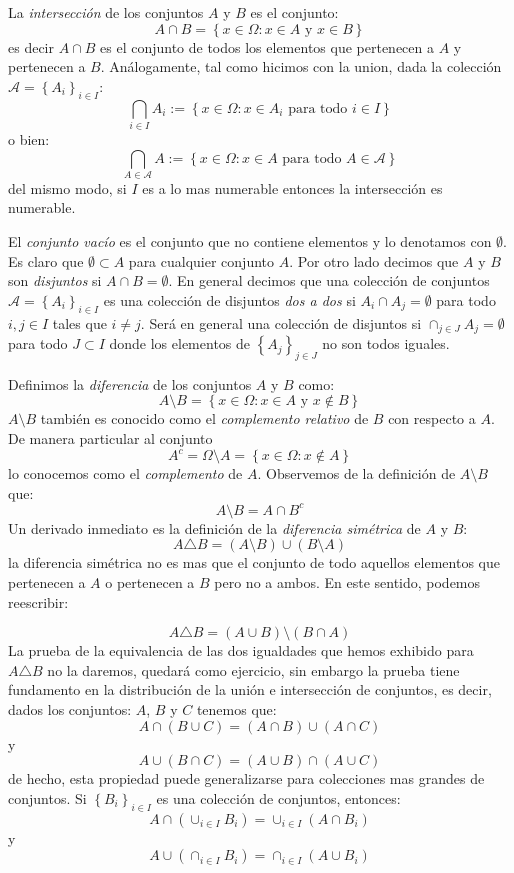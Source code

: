 \documentclass[14pt]{extreport}
\begin{document}
La \emph{intersección} de los conjuntos $A$ y $B$ es el conjunto:
$$
A\cap B = \left\{x\in \Omega: x \in A \text{ y } x \in B\right\}
$$
es decir $A\cap B$ es el conjunto de todos los elementos que pertenecen a $A$ y pertenecen a $B$. Análogamente, tal como hicimos con la union, dada la colección $\mathcal{A} = \left\{A_i\right\}_{i\in I}$:
$$
\bigcap_{i\in I}A_i := \left\{x\in \Omega: x \in A_i \text{ para todo } i\in I \right\}
$$
\noindent
o bien:
\noindent
$$
\bigcap_{A\in \mathcal{A}}A := \left\{x\in \Omega: x \in A \text{ para todo } A\in \mathcal{A} \right\}
$$
del mismo modo, si $I$ es a lo mas numerable entonces la intersección es numerable.

El \emph{conjunto vacío} es el conjunto que no contiene elementos y lo denotamos con $\emptyset$. Es claro que $\emptyset \subset A$ para cualquier conjunto $A$. Por otro lado decimos que $A$ y $B$ son \emph{disjuntos} si $A\cap B = \emptyset$. En general decimos que una colección de conjuntos $\mathcal{A} = \left\{A_i\right\}_{i\in I}$ es una colección de disjuntos \emph{dos a dos} si $A_i\cap A_j = \emptyset$ para todo $i, j\in I$ tales que $i\neq j$. Será en general una colección de disjuntos si $\cap_{j\in J} A_j = \emptyset$ para todo $J \subset I$ donde los elementos de $\left\{A_j\right\}_{j\in J}$ no son todos iguales.

Definimos la \emph{diferencia} de los conjuntos $A$ y $B$ como:
$$
A\setminus B = \left\{x\in \Omega: x  \in A \text{ y } x\notin B\right\}
$$
$A\setminus B$ también es conocido como el \emph{complemento relativo} de $B$ con respecto a $A$. De manera particular al conjunto 
$$
A^c = \Omega\setminus A = \left\{x\in \Omega: x\notin A\right\}
$$
lo conocemos como el \emph{complemento} de $A$.
Observemos de la definición de $A\setminus B$ que:
$$
A\setminus B = A \cap B^c
$$
Un derivado inmediato es la definición de la \emph{diferencia simétrica} de $A$ y $B$:
$$
A\triangle B = (A\setminus B) \cup (B\setminus A)
$$
la diferencia simétrica no es mas que el conjunto de todo aquellos elementos que pertenecen a $A$ o pertenecen a $B$ pero no a ambos. En este sentido, podemos reescribir:

$$
A\triangle B = (A\cup B) \setminus (B\cap A)
$$
La prueba de la equivalencia de las dos igualdades que hemos exhibido para $A\triangle B$ no la daremos, quedará como ejercicio, sin embargo la prueba tiene fundamento en la distribución de la unión e intersección de conjuntos, es decir, dados los conjuntos: $A$, $B$ y $C$ tenemos que:
$$
A \cap (B\cup C) = (A\cap B) \cup (A\cap C)
$$
y 
$$
A \cup (B\cap C) = (A\cup B) \cap (A\cup C)
$$
de hecho, esta propiedad puede generalizarse para colecciones mas grandes de conjuntos. Si $\left\{B_i\right\}_{i\in I}$ es una colección de conjuntos, entonces:
$$
A\cap \left(\cup_{i\in I} B_i\right) = \cup_{i\in I}\left(A\cap B_i\right)
$$
y 
$$
A\cup \left(\cap_{i\in I} B_i\right) = \cap_{i\in I}\left(A\cup B_i\right)
$$
\end{document}
